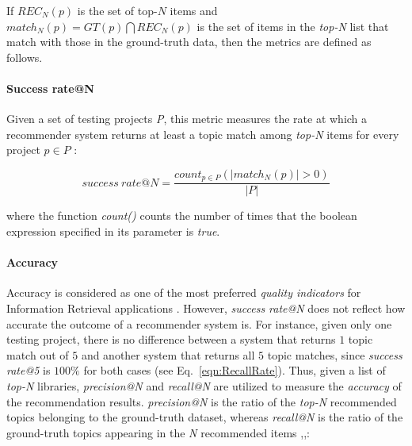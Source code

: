 If $REC_{N}(p)$ is the set of top-$N$ items and $match_{N}(p)=  GT(p) \bigcap REC_{N}(p) $ is the set of items in the \emph{top-N} list that match with those in the ground-truth data, then the metrics are defined as follows.

\paragraph{\textbf{Success rate@N}} Given a set of testing projects \emph{P}, this metric measures the rate at which a recommender system returns at least a topic match among \emph{top-N} items for every project $p \in P$ \cite{6671293}: %
\vspace{-.3cm}

\begin{equation} \label{eqn:RecallRate}
success\ rate@N=\frac{ count_{p \in P}( \left |  match_{N}(p) \right | > 0 ) }{\left | P \right |} %
\end{equation}

\noindent where the function \emph{count()} counts the number of times that the boolean expression specified in its parameter is \emph{true}.


\paragraph{\textbf{Accuracy}} Accuracy is considered as one of the most preferred \emph{quality indicators} for Information Retrieval applications \cite{Saracevic:1995:EEI:215206.215351}. However, \emph{success rate@N} does not reflect how accurate the outcome of a recommender system is. For instance, given only one testing project, there is no difference between a system that returns $1$ topic match out of $5$ and another system that returns all $5$ topic matches, since \emph{success rate@5} is $100\%$ for both cases (see Eq.~\eqref{eqn:RecallRate}). Thus, given a list of \emph{top-N} libraries, \emph{precision@N} and \emph{recall@N} are utilized to measure the \emph{accuracy} of the recommendation results. \emph{precision@N} is the ratio of the \emph{top-N} recommended topics belonging to the ground-truth dataset, whereas \emph{recall@N} is the ratio of the ground-truth topics appearing in the \emph{N} recommended items \cite{Nguyen:2019:FRS:3339505.3339636},\cite{DiNoia:2012:LOD:2362499.2362501},\cite{Davis:2006:RPR:1143844.1143874}: %

